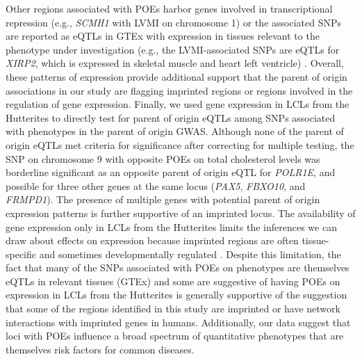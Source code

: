 Other regions associated with POEs harbor genes involved in transcriptional repression (e.g., \emph{SCMH1} with LVMI on chromosome 1) or the associated SNPs are reported as eQTLs in GTEx with expression in tissues relevant to the phenotype under investigation (e.g., the LVMI-associated SNPs are eQTLs for \emph{XIRP2}, which is expressed in skeletal muscle and heart left ventricle) \cite{Consortium2015}. Overall, these patterns of expression provide additional support that the parent of origin associations in our study are flagging imprinted regions or regions involved in the regulation of gene expression. Finally, we used gene expression in LCLs from the Hutterites to directly test for parent of origin eQTLs among SNPs associated with phenotypes in the parent of origin GWAS. Although none of the parent of origin eQTLs met criteria for significance after correcting for multiple testing, the SNP on chromosome 9 with opposite POEs on total cholesterol levels was borderline significant as an opposite parent of origin eQTL for \emph{POLR1E}, and possible for three other genes at the same locus (\emph{PAX5}, \emph{FBXO10}, and \emph{FRMPD1}). The presence of multiple genes with potential parent of origin expression patterns is further supportive of an imprinted locus. The availability of gene expression only in LCLs from the Hutterites limits the inferences we can draw about effects on expression because imprinted regions are often tissue-specific and sometimes developmentally regulated \cite{Peters2014,Falls1999}. Despite this limitation, the fact that many of the SNPs associated with POEs on phenotypes are themselves eQTLs in relevant tissues (GTEx) and some are suggestive of having POEs on expression in LCLs from the Hutterites is generally supportive of the suggestion that some of the regions identified in this study are imprinted or have network interactions with imprinted genes\cite{Chess:2016fs} in humans. Additionally, our data suggest that loci with POEs influence a broad spectrum of quantitative phenotypes that are themselves risk factors for common diseases. 

